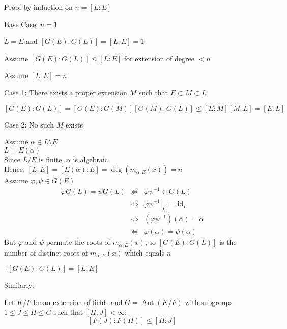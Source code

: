 \documentclass[letterpaper,12pt,fleqn]{article}
\renewcommand{\a}{\alpha}
\newcommand{\p}{\varphi}
\newcommand{\s}{\psi}
\newcommand{\rest}[2]{\left.#1\right|_{#2}}
\DeclareMathOperator{\Aut}{Aut}
\DeclareMathOperator{\id}{id}
\begin{document}
\begin{theproof}
  Proof by induction on $n=[L:E]$

  \begin{description}
  \item Base Case: $n=1$

    $L=E$ and $[G(E):G(L)]=[L:E]=1$

  \item Assume $[G(E):G(L)]\le[L:E]$ for extension of degree $<n$

  \item Assume $[L:E]=n$

    \begin{description}
    \item Case 1: There exists a proper extension $M$ such that
      $E\subset M\subset L$

      $[G(E):G(L)]=[G(E):G(M)][G(M):G(L)]\le[E:M][M:L]=[E:L]$

    \item Case 2: No such $M$ exists

      Assume $\a\in L\setminus E$ \\
      $L=E(\a)$ \\
      Since $L/E$ is finite, $\a$ is algebraic \\
      Hence, $[L:E]=[E(\a):E]=\deg(m_{\a,E}(x))=n$ \\

      Assume $\p,\s\in G(E)$
      \begin{eqnarray*}
        \p G(L)=\s G(L) &\iff& \p\s^{-1}\in G(L) \\
        &\iff& \rest{\p\s^{-1}}{L}=\id_L \\
        &\iff& (\p\s^{-1})(\a)=\a \\
        &\iff& \p(\a)=\s(\a)
      \end{eqnarray*}
      But $\p$ and $\s$ permute the roots of $m_{\a,E}(x)$, so $[G(E):G(L)]$ is
      the number of distinct roots of $m_{\a,E}(x)$ which equals $n$
    \end{description}

    $\therefore[G(E):G(L)]=[L:E]$
  \end{description}
\end{theproof}

Similarly:

\begin{theorem}
  Let $K/F$ be an extension of fields and $G=\Aut(K/F)$ with subgroups
  $1\le J\le H\le G$ such that $[H:J]<\infty$:
  \[[F(J):F(H)]\le[H:J]\]
\end{theorem}
\end{document}
